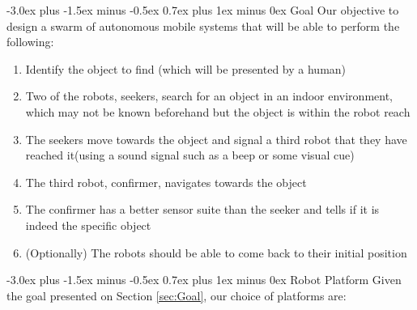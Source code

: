 \documentclass[conference]{IEEEtran}
\makeatletter
\renewcommand\section{\@startsection{section}{1}{\z@}
                                  {-3.0ex plus -1.5ex minus -0.5ex}
                                  {0.7ex plus 1ex minus 0ex}
                                  {\bfseries}}
\makeatother
\begin{document}
\section{Goal}
\label{sec:Goal}
Our objective to design a swarm of autonomous mobile
systems that will be able to perform the following:

\begin{enumerate}
\item{ Identify the object to find (which will be presented by a human) }
\item{Two of the robots, seekers, search for an object in an indoor environment, which may
not be known beforehand but the object is within the robot reach }
\item{ The seekers move towards the object and signal a third robot that they have reached it(using
a sound signal such as a beep or some visual cue) }
\item{The third robot, confirmer, navigates towards the object}
\item{The confirmer has a better sensor suite than the seeker and tells if it is indeed the specific object}
\item{(Optionally) The robots should be able to come back to their 
initial position}
\end{enumerate}

\section{Robot Platform}
Given the goal presented on Section \ref{sec:Goal}, 
our choice of platforms are: 
\end{document}
